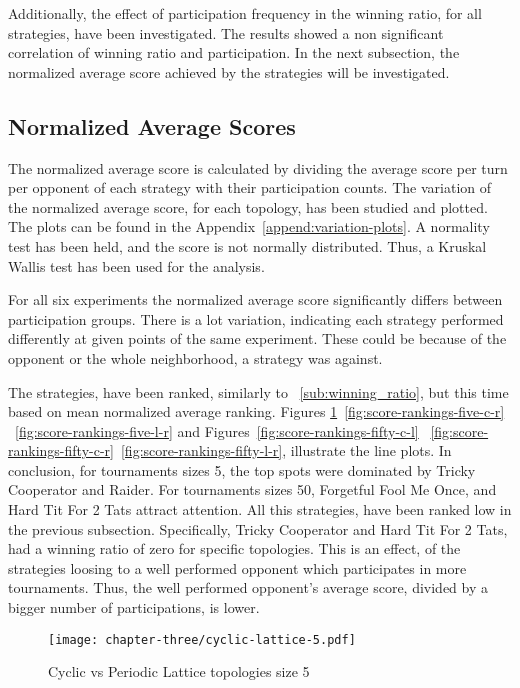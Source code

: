 Additionally, the effect of participation frequency in the winning ratio, for
all strategies, have been investigated. The results showed a non significant
correlation of winning ratio and participation. In the next subsection, the
normalized average score achieved by the strategies will be investigated.

\subsection{Normalized Average Scores}
\label{sub:normalized_av_score}
The normalized average score is calculated by dividing the average score per
turn per opponent of each strategy with their participation counts. The variation
of the normalized average score, for each topology, has been studied and plotted.
The plots can be found in the Appendix~\ref{append:variation-plots}. A normality
test has been held, and the score is not normally distributed. Thus, a Kruskal
Wallis test has been used for the analysis.

For all six experiments the normalized average score significantly differs between
participation groups. There is a lot variation, indicating each strategy performed
differently at given points of the same experiment. These could be because of the
opponent or the whole neighborhood, a strategy was against.

The strategies, have been ranked, similarly to ~\autoref{sub:winning_ratio}, but
this time based on mean normalized average ranking. Figures \ref{fig:score-rankings-five-c-l}~\ref{fig:score-rankings-five-c-r}
~\ref{fig:score-rankings-five-l-r} and Figures~\ref{fig:score-rankings-fifty-c-l}
~\ref{fig:score-rankings-fifty-c-r}~\ref{fig:score-rankings-fifty-l-r}, illustrate
the line plots. In conclusion, for tournaments sizes 5, the top spots were dominated
by Tricky Cooperator and Raider. For tournaments sizes 50, Forgetful Fool Me Once,
and Hard Tit For 2 Tats attract attention. All this strategies, have been ranked
low in the previous subsection. Specifically, Tricky Cooperator and Hard Tit For 2 Tats,
had a winning ratio of zero for specific topologies. This is an effect, of the
strategies loosing to a well performed opponent which participates in more tournaments.
Thus, the well performed opponent's average score, divided by a bigger number
of participations, is lower.

\begin{figure}[H]
	\centering
	\texttt{[image: chapter-three/cyclic-lattice-5.pdf]}
	\caption{Cyclic vs Periodic Lattice topologies size 5}
	\label{fig:score-rankings-five-c-l}
\end{figure}

